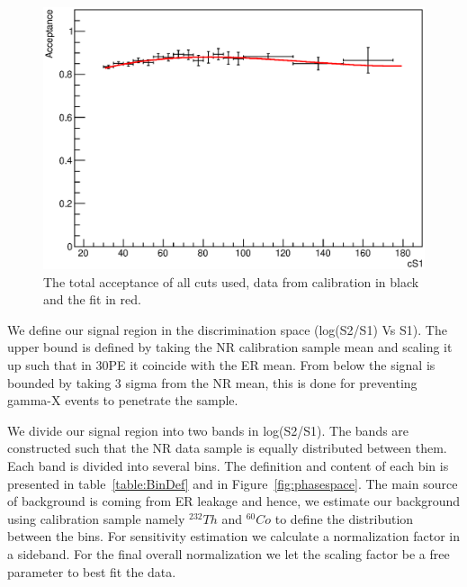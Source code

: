 \begin{figure}[h!]
\begin{minipage}{1.\linewidth}
\centerline{\includegraphics[width=1.\linewidth]{Figures/Acceptance.eps}}
\end{minipage}
\caption{The total acceptance of all cuts used, data from calibration in black and the fit in red.}
\label{fig:Acc}
\end{figure}

We define our signal region in the discrimination space (log(S2/S1) Vs S1). The upper bound is defined by taking the NR calibration sample mean and scaling it up such that in 30PE it coincide with the ER mean. From below the signal is bounded by taking 3 sigma from the NR mean, this is done for preventing gamma-X events to penetrate the sample. 

We divide our signal region into two bands in log(S2/S1). The bands are constructed such that the NR data sample is equally distributed between them. Each band is divided into several bins. The definition and content of each bin is presented in table~\ref{table:BinDef} and in Figure~\ref{fig:phasespace}. The main source of background is coming from ER leakage and hence, we estimate our background using calibration sample namely $^{232}Th$ and $^{60}Co$ to define the distribution between the bins. For sensitivity estimation we calculate a normalization factor in a sideband. For the final overall normalization we let the scaling factor be a free parameter to best fit the data.






